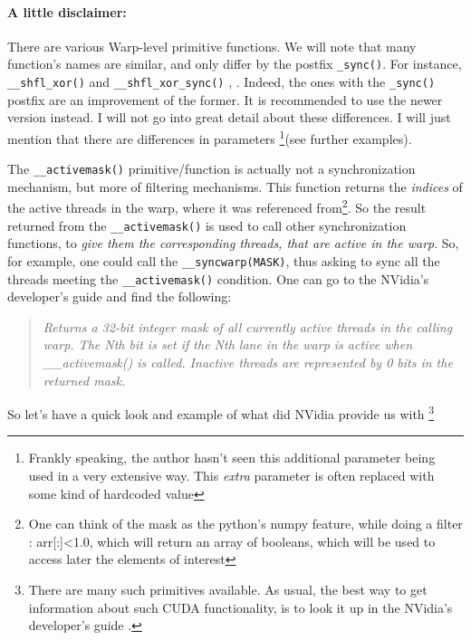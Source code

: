 \paragraph{A little disclaimer: }There are various Warp-level primitive functions. We will note that many function's
names are similar, and only differ by the postfix \verb|_sync()|. For instance, 
\verb|__shfl_xor()| and \verb|__shfl_xor_sync()| \cite{chinese_sync}, \cite{conference_gpu}. Indeed, the ones with the \verb|_sync()|
postfix are an improvement of the former. It is recommended to use the newer version instead.
I will not go into great detail about these differences. 
I will just mention that there are differences in parameters
\footnote{Frankly speaking, the author hasn't seen this additional parameter 
being used in a very extensive way. This \textit{extra} parameter is often replaced with 
some kind of hardcoded value}(see further examples).


The \verb|__activemask()| primitive/function is actually not a synchronization 
mechanism, but more of filtering mechanisms. This function returns the \textit{indices}
of the active threads in the warp, where it was referenced from\footnote{One can think 
of the mask as the python's numpy feature, while doing a filter : {\selectfont arr[:]<1.0}, which 
will return an array of booleans, which will be used to access later the elements of interest}. 
So the result returned from the \verb|__activemask()| is used to call other synchronization functions, 
to \textit{give them the corresponding threads, that are active in the warp}.
So, for example, one could call the  \verb|__syncwarp(MASK)|, thus asking 
to sync all the threads meeting the \verb|__activemask()| condition. 
One can go to the NVidia's developer's guide \cite{center} and find the following:

\begin{quote}
    \textsl{
Returns a 32-bit integer mask of all currently active threads in the calling warp. 
The Nth bit is set if the Nth lane in the warp is active when \_\_activemask() is called. 
Inactive threads are represented by 0 bits in the returned mask.
    }
\end{quote}

So let's have a quick look and example of what did NVidia provide us with 
\footnote{There are many such primitives available. As usual, the best way to get information about such 
CUDA functionality, is to look it up in the NVidia's developer's guide \cite{center}.}


